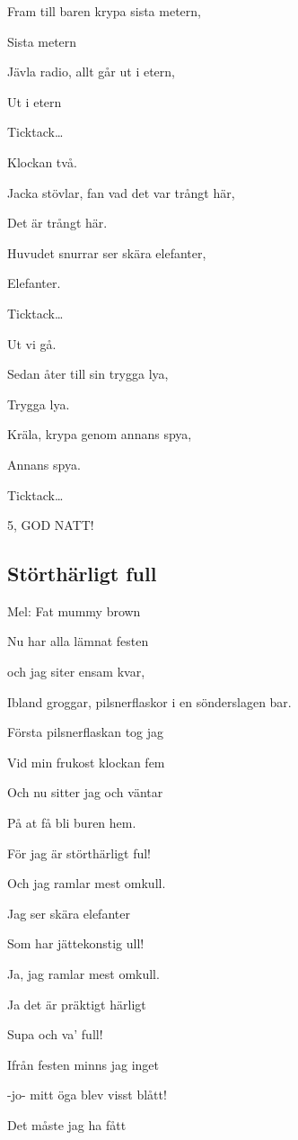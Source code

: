 Fram till baren krypa sista metern,

Sista metern

Jävla radio, allt går ut i etern,

Ut i etern

Ticktack…

Klockan två.\bigskip

Jacka stövlar, fan vad det var trångt här,

Det är trångt här.

Huvudet snurrar ser skära elefanter,

Elefanter.

Ticktack…

Ut vi gå. \bigskip

Sedan åter till sin trygga lya,

Trygga lya.

Kräla, krypa genom annans spya,

Annans spya.

Ticktack…

5, GOD NATT!\bigskip

\subsection{\textbf{Störthärligt full }}

Mel: Fat mummy brown \bigskip


Nu har alla lämnat festen

och jag siter ensam kvar,

Ibland groggar, pilsnerflaskor i en sönderslagen bar.

Första pilsnerflaskan tog jag

Vid min frukost klockan fem

Och nu sitter jag och väntar

På at få bli buren hem.\bigskip

För jag är störthärligt ful!

Och jag ramlar mest omkull.

Jag ser skära elefanter

Som har jättekonstig ull!

Ja, jag ramlar mest omkull.

Ja det är präktigt härligt

Supa och va’ full!\bigskip

Ifrån festen minns jag inget

-jo- mitt öga blev visst blått!

Det måste jag ha fått

